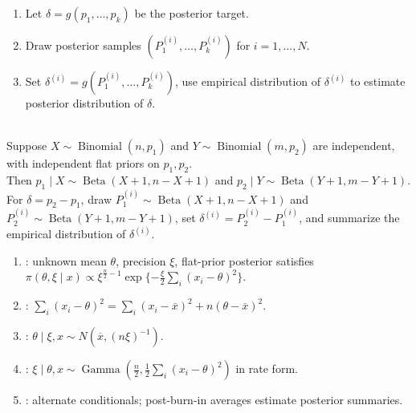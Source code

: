 \begin{method} \label{method:posterior-function-simulation} 
\begin{enumerate}[label=(\roman*)]
\setlength{\itemsep}{0pt}
\item Let $\delta=g(p_1,\ldots,p_k)$ be the posterior target.
\item Draw posterior samples $(P_1^{(i)},\ldots,P_k^{(i)})$ for $i=1,\ldots,N$.
\item Set $\delta^{(i)}=g(P_1^{(i)},\ldots,P_k^{(i)})$, use empirical distribution of $\delta^{(i)}$ to estimate posterior distribution of $\delta$.
\end{enumerate}
\end{method}

\begin{example} \label{ex:two-binomial-posterior-simulation} \\
Suppose $X\sim\operatorname{Binomial}(n,p_1)$ and $Y\sim\operatorname{Binomial}(m,p_2)$ are independent, with independent flat priors on $p_1,p_2$.\\
Then $p_1\mid X\sim\operatorname{Beta}(X+1,n-X+1)$ and $p_2\mid Y\sim\operatorname{Beta}(Y+1,m-Y+1)$.\\
For $\delta=p_2-p_1$, draw $P_1^{(i)}\sim\operatorname{Beta}(X+1,n-X+1)$ and $P_2^{(i)}\sim\operatorname{Beta}(Y+1,m-Y+1)$, set $\delta^{(i)}=P_2^{(i)}-P_1^{(i)}$, and summarize the empirical distribution of $\delta^{(i)}$.
\end{example}

\begin{method} \label{meth:gibbs-sampling-normal-mean-precision} 
\begin{enumerate}[label=(\roman*)]
\setlength{\itemsep}{0pt}
\item {}: unknown mean $\theta$, precision $\xi$, flat-prior posterior satisfies $\pi(\theta,\xi\mid x)\propto\xi^{\frac{n}{2}-1}\exp\{-\frac{\xi}{2}\sum\limits_i(x_i-\theta)^2\}$.
\item {}: $\sum\limits_i(x_i-\theta)^2=\sum\limits_i(x_i-\overline{x})^2+n(\theta-\overline{x})^2$.
\item {}: $\theta\mid\xi,x\sim N(\overline{x},(n\xi)^{-1})$.
\item {}: $\xi\mid\theta,x\sim\operatorname{Gamma}(\frac{n}{2},\frac12\sum\limits_i(x_i-\theta)^2)$ in rate form.
\item {}: alternate conditionals; post-burn-in averages estimate posterior summaries.
\end{enumerate}
\end{method}

